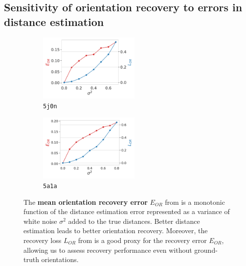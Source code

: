 \subsection{Sensitivity of orientation recovery to errors in distance estimation}\label{sec:results:orientation-recovery:sensitivity}


\begin{figure}
    \centering
    \begin{subfigure}[b]{0.48\linewidth}
        \includegraphics[height=3.3cm]{figures/5j0n_perfect_noisy_ar_aa}
        \caption{\texttt{5j0n}}
    \end{subfigure}
    \hfill
    \begin{subfigure}[b]{0.50\linewidth}
    \centering
        \includegraphics[height=3.3cm]{figures/5a1a_perfect_noisy_ar_aa}
        \caption{\texttt{5a1a}}
    \end{subfigure}
    \caption{
        The \textbf{mean orientation recovery error} $E_{OR}$ from  is a monotonic function of the distance estimation error represented as a variance of white noise $\sigma^2$ added to the true distances.
        Better distance estimation leads to better orientation recovery.
        Moreover, the recovery loss $L_{OR}$ from  is a good proxy for the recovery error $E_{OR}$, allowing us to assess recovery performance even without ground-truth orientations.
    }\label{fig:perfect-with-noise-ar-aa}
\end{figure}

